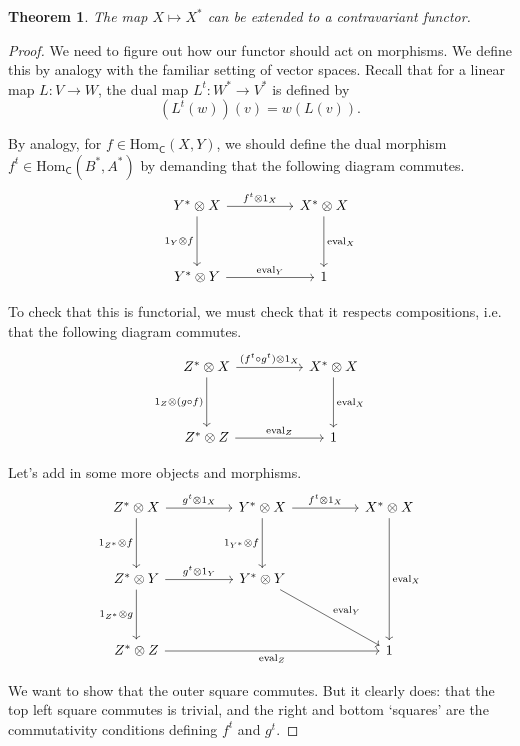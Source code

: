 \documentclass[a4paper,10pt]{scrreprt}
\newcommand{\Hom}{\mathrm{Hom}}
\newcommand{\ev}{\mathrm{eval}}
\theoremstyle{definition}
\theoremstyle{plain}
\newtheorem{theorem}{Theorem}[section]
\theoremstyle{remark}
\begin{document}
\begin{theorem}
  The map $X \mapsto X^{*}$ can be extended to a contravariant functor.
\end{theorem}
\begin{proof}
  We need to figure out how our functor should act on morphisms. We define this by analogy with the familiar setting of vector spaces. Recall that for a linear map $L\colon V \to W$, the dual map $L^{t}\colon W^{*} \to V^{*}$ is defined by
  \begin{equation*}
    (L^{t}(w))(v) = w(L(v)).
  \end{equation*}

  By analogy, for $f \in \Hom_{\mathsf{C}}(X, Y)$, we should define the dual morphism $f^{t} \in \Hom_{\mathsf{C}}(B^{*}, A^{*})$ by demanding that the following diagram commutes.
  \begin{equation*}
    \begin{tikzcd}[row sep=huge, column sep=huge]
      Y^{*} \otimes X
      \arrow[r, "f^{t} \otimes 1_{X}"]
      \arrow[d, swap, "1_{Y} \otimes f"]
      & X^{*} \otimes X
      \arrow[d, "\ev_{X}"]
      \\
      Y^{*} \otimes Y
      \arrow[r, "\ev_{Y}"]
      & 1
    \end{tikzcd}
  \end{equation*}

  To check that this is functorial, we must check that it respects compositions, i.e. that the following diagram commutes.
  \begin{equation*}
    \begin{tikzcd}[row sep=huge, column sep=huge]
      Z^{*} \otimes X
      \arrow[r, "(f^{t} \circ g^{t}) \otimes 1_{X}"]
      \arrow[d, swap, "1_{Z} \otimes (g \circ f)"]
      & X^{*} \otimes X
      \arrow[d, "\ev_{X}"]
      \\
      Z^{*} \otimes Z
      \arrow[r, "\ev_{Z}"]
      & 1
    \end{tikzcd}
  \end{equation*}

  Let's add in some more objects and morphisms.
  \begin{equation*}
    \begin{tikzcd}[row sep=huge, column sep=huge]
      Z^{*} \otimes X
      \arrow[r, "g^{t} \otimes 1_{X}"]
      \arrow[d, swap, "1_{Z^{*}} \otimes f"]
      & Y^{*} \otimes X
      \arrow[r, "f^{t} \otimes 1_{X}"]
      \arrow[d, swap, "1_{Y^{*}} \otimes f"]
      & X^{*} \otimes X
      \arrow[dd, "\ev_{X}"]
      \\
      Z^{*} \otimes Y
      \arrow[r, "g^{t} \otimes 1_{Y}"]
      \arrow[d, swap, "1_{Z^{*}} \otimes g"]
      & Y^{*} \otimes Y
      \arrow[dr, "\ev_{Y}"]
      \\
      Z^{*} \otimes Z
      \arrow[rr, swap, "\ev_{Z}"]
      & & 1
    \end{tikzcd}
  \end{equation*}

  We want to show that the outer square commutes. But it clearly does: that the top left square commutes is trivial, and the right and bottom `squares' are the commutativity conditions defining $f^{t}$ and $g^{t}$.
\end{proof}
\end{document}

